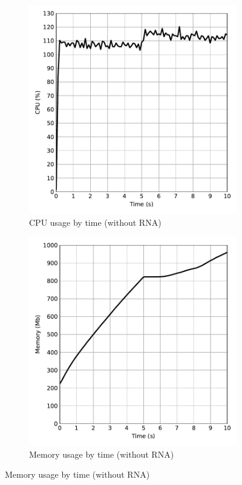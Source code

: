 \begin{figure}[htb]
    \caption{Performance evaluation without RNA}
    \begin{subfigure}{.5\textwidth}
        \centering
        \vspace{1em}
        \caption{CPU usage by time (without RNA)}
        \includegraphics[width=1.0\textwidth]{images/cpu_without_rna.pdf}
    \end{subfigure}%
    \begin{subfigure}{.5\textwidth}
        \centering
        \vspace{1em}
        \caption{Memory usage by time (without RNA)}
        \includegraphics[width=1.0\textwidth]{images/memory_without_rna.pdf}
    \end{subfigure}
    \label{fig:perf_without_rna}
\end{figure}
